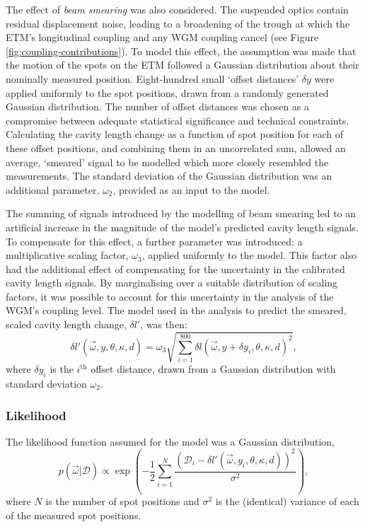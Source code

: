 The effect of \emph{beam smearing} was also considered. The suspended optics contain residual displacement noise, leading to a broadening of the trough at which the \gls{ETM}'s longitudinal coupling and any \gls{WGM} coupling cancel (see Figure\,\ref{fig:coupling-contributions}). To model this effect, the assumption was made that the motion of the spots on the \gls{ETM} followed a Gaussian distribution about their nominally measured position. Eight-hundred small `offset distances' $\delta y$ were applied uniformly to the spot positions, drawn from a randomly generated Gaussian distribution. The number of offset distances was chosen as a compromise between adequate statistical significance and technical constraints. Calculating the cavity length change as a function of spot position for each of these offset positions, and combining them in an uncorrelated sum, allowed an average, `smeared' signal to be modelled which more closely resembled the measurements. The standard deviation of the Gaussian distribution was an additional parameter, $\omega_2$, provided as an input to the model.

The summing of signals introduced by the modelling of beam smearing led to an artificial increase in the magnitude of the model's predicted cavity length signals. To compensate for this effect, a further parameter was introduced: a multiplicative scaling factor, $\omega_3$, applied uniformly to the model. This factor also had the additional effect of compensating for the uncertainty in the calibrated cavity length signals. By marginalising over a suitable distribution of scaling factors, it was possible to account for this uncertainty in the analysis of the \gls{WGM}'s coupling level. The model used in the analysis to predict the smeared, scaled cavity length change, $\delta l'$, was then:
\begin{equation}
  \delta l' \left( \vec{\omega}, y, \theta, \kappa, d \right) = \omega_3 \sqrt{\sum_{i=1}^{800} \delta l \left( \vec{\omega}, y + \delta y_i, \theta, \kappa, d \right)^2},
  \label{eq:model}
\end{equation}
where $\delta y_i$ is the $i^\text{th}$ offset distance, drawn from a Gaussian distribution with standard deviation $\omega_2$.

\subsubsection{Likelihood}
The likelihood function assumed for the model was a Gaussian distribution,
\begin{equation}
  p \left( \vec{\omega} | \mathcal{D} \right) \propto \exp \left( -\frac{1}{2} \sum_{i=1}^{N} \frac{\left( \mathcal{D}_i - \delta l' \left( \vec{\omega}, y_i, \theta, \kappa, d \right) \right)^2}{\sigma^2} \right),
  \label{eq:likelihood}
\end{equation}
where $N$ is the number of spot positions and $\sigma^2$ is the (identical) variance of each of the measured spot positions.

